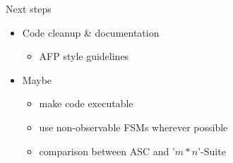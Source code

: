 \documentclass[aspectratio=169]{beamer}
\begin{document}
\begin{frame}{Next steps}
\begin{itemize}
	\item Code cleanup \& documentation
	\begin{itemize}
		\item AFP style guidelines
	\end{itemize}
    \item Maybe
    \begin{itemize}
        \item make code executable
        \item use non-observable FSMs wherever possible
        \item comparison between ASC and '$m*n$'-Suite
    \end{itemize}
\end{itemize}
\end{frame}
\end{document}
